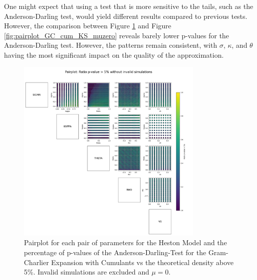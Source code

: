 One might expect that using a test that is more sensitive to the tails, such as the Anderson-Darling test, would yield different results compared to previous tests. However, the comparison between Figure \ref{fig:pairplot_GC_cum_AD_muzero} and Figure \ref{fig:pairplot_GC_cum_KS_muzero} reveals barely lower p-values for the Anderson-Darling test. However, the patterns remain consistent, with $\sigma$, $\kappa$, and $\theta$ having the most significant impact on the quality of the approximation.

\begin{figure}
    \centering
    \includegraphics[width=0.8\textwidth]{img/pairplot_GC_cum_AD_muzero.png}
    \caption{Pairplot for each pair of parameters for the Heston Model and the percentage of p-values of the Anderson-Darling-Test for the Gram-Charlier Expansion with Cumulants vs the theoretical density above 5\%. Invalid simulations are excluded and $\mu=0$.}
    \label{fig:pairplot_GC_cum_AD_muzero}
\end{figure}